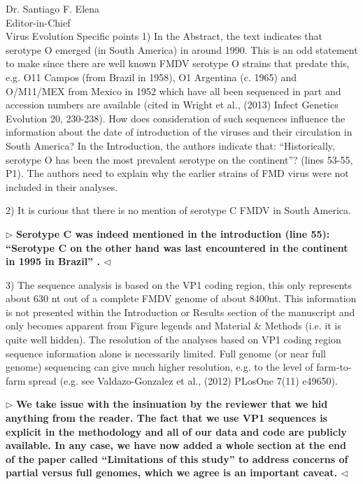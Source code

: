 \documentclass[ucla,biomath,12pt,noaddrfooter,datefrom]{UC_letter}
\newenvironment{reply}{$\triangleright$\bf}{$\triangleleft$}
\renewenvironment{quote}
               {\list{}{\rightmargin\leftmargin}%
                \item\relax\normalfont}
               {\endlist}
\begin{document}
\begin{letter}{
Dr. Santiago F. Elena \\
Editor-in-Chief \\
Virus Evolution
}
Specific points
1)      In the Abstract, the text indicates that serotype O emerged (in South America) in around 1990. 
This is an odd statement to make since there are well known FMDV serotype O strains that predate this, e.g. O11 Campos (from Brazil in 1958), O1 Argentina (c. 1965) and O/M11/MEX from Mexico in 1952 which have all been sequenced in part and accession numbers are available (cited in Wright et al., (2013) Infect Genetics Evolution 20, 230-238).  
How does consideration of such sequences influence the information about the date of introduction of the viruses and their circulation in South America? 
In the Introduction, the authors indicate that: ``Historically, serotype O has been the most prevalent serotype on the continent''? (lines 53-55, P1). 
The authors need to explain why the earlier strains of FMD virus were not included in their analyses.


2)      It is curious that there is no mention of serotype C FMDV in South America.

\begin{reply}
Serotype C was indeed mentioned in the introduction (line 55): ``Serotype C on the other hand was last encountered in the continent in 1995 in Brazil'' .
\end{reply}

3)      The sequence analysis is based on the VP1 coding region, this only represents about 630 nt out of a complete FMDV genome of about 8400nt. 
This information is not presented within the Introduction or Results section of the manuscript and only becomes apparent from Figure legends and Material \& Methods (i.e. it is quite well hidden). 
The resolution of the analyses based on VP1 coding region sequence information alone is necessarily limited. 
Full genome (or near full genome) sequencing can give much higher resolution, e.g. to the level of farm-to-farm spread (e.g. see Valdazo-Gonzalez et al., (2012) PLosOne 7(11) e49650).

\begin{reply}
We take issue with the insinuation by the reviewer that we hid anything from the reader. 
The fact that we use VP1 sequences is explicit in the methodology and all of our data and code are publicly available.
In any case, we have now added a whole section at the end of the paper called ``Limitations of this study'' to address concerns of partial versus full genomes, which we agree is an important caveat.
\end{reply}


\end{letter}
\end{document}
